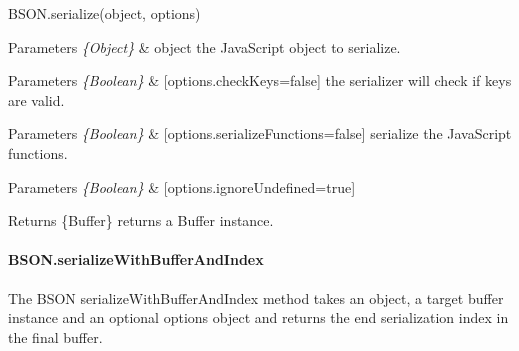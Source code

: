 \begin{DoxyItemize}
\item {\ttfamily B\+S\+O\+N.\+serialize(object, options)}
\begin{DoxyItemize}
\item 
\begin{DoxyParams}{Parameters}
{\em \{\+Object\}} & object the Java\+Script object to serialize.\\
\hline
\end{DoxyParams}

\item 
\begin{DoxyParams}{Parameters}
{\em \{\+Boolean\}} & \mbox{[}options.\+check\+Keys=false\mbox{]} the serializer will check if keys are valid.\\
\hline
\end{DoxyParams}

\item 
\begin{DoxyParams}{Parameters}
{\em \{\+Boolean\}} & \mbox{[}options.\+serialize\+Functions=false\mbox{]} serialize the Java\+Script functions.\\
\hline
\end{DoxyParams}

\item 
\begin{DoxyParams}{Parameters}
{\em \{\+Boolean\}} & \mbox{[}options.\+ignore\+Undefined=true\mbox{]}\\
\hline
\end{DoxyParams}

\item \begin{DoxyReturn}{Returns}
\{Buffer\} returns a Buffer instance.
\end{DoxyReturn}
\paragraph*{B\+S\+O\+N.\+serialize\+With\+Buffer\+And\+Index}
\end{DoxyItemize}
\end{DoxyItemize}

The B\+S\+ON {\ttfamily serialize\+With\+Buffer\+And\+Index} method takes an object, a target buffer instance and an optional options object and returns the end serialization index in the final buffer.


